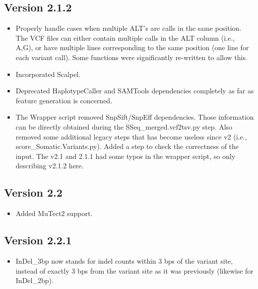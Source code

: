 \documentclass[10pt,letterpaper]{article}
\begin{document}
\begin{sloppypar}
\subsection{Version 2.1.2}

\begin{itemize}

  \item
  Properly handle cases when multiple ALT's are calls in the same position. The VCF files can either contain multiple calls in the ALT column (i.e., A,G), or have multiple lines corresponding to the same position (one line for each variant call). Some functions were significantly re-written to allow this.

  \item
  Incorporated Scalpel.
  
  \item
  Deprecated HaplotypeCaller and SAMTools dependencies completely as far as feature generation is concerned.
  
  \item
  The Wrapper script removed SnpSift/SnpEff dependencies. Those information can be directly obtained during the SSeq\_merged.vcf2tsv.py step. Also removed some additional legacy steps that has become useless since v2 (i.e., score\_Somatic.Variants.py). Added a step to check the correctness of the input. The v2.1 and 2.1.1 had some typos in the wrapper script, so only describing v2.1.2 here.

\end{itemize}



\subsection{Version 2.2}

\begin{itemize}

  \item
  Added MuTect2 support.

\end{itemize}



\subsection{Version 2.2.1}

\begin{itemize}

  \item
  InDel\_3bp now stands for indel counts within 3 bps of the variant site, instead of exactly 3 bps from the variant site as it was previously (likewise for InDel\_2bp). 
 

\end{itemize}
\end{sloppypar}
\end{document}
